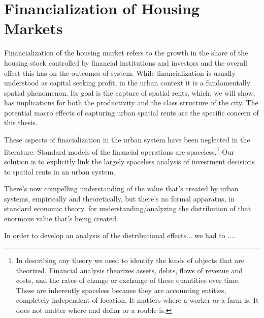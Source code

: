

\section{Financialization of Housing Markets}

Financialization of the housing market refers to the growth in the share of the housing stock controlled by financial institutions and investors and the overall effect this has on the outcomes of system.
While financialization is usually understood as capital seeking profit, in the urban context it is a fundamentally spatial phenomenon. %
Its goal is the capture of spatial rents, which, we will show, has implications for both the productivity and the class structure of the city. 
The potential macro effects of capturing urban spatial rents are the specific concern of this thesis.  

These aspects of finacialization in the urban system have been neglected in the literature. Standard models of the financial operations are spaceless.\footnote{In describing any theory we need to identify the kinds of objects that are theorized. Financial analysis theorizes  assets, debts, flows of revenue and costs, and the rates of change or exchange of these quantities over time. These are inherently spaceless because they are accounting entities, completely independent of location. It matters where a worker or a farm is. It does not matter where and dollar or a rouble is.} 
Our solution is to explicitly link the largely spaceless analysis of investment decisions to spatial rents in an urban system. 

There's now compelling understanding of the value that's created by urban systems, empirically and theoretically, but there's no formal apparatus, in standard economic theory,  for understanding/analyzing the distribution of that enormous value that's being created. 

In order to develop an analysis of the distributional effects... we had to ....  

